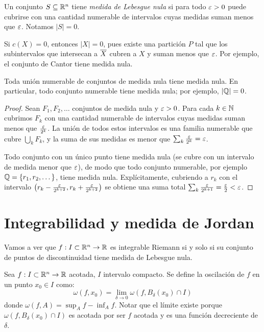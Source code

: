 \begin{definition}
  Un conjunto \(S \subseteq \mathbb{R}^n\) tiene \emph{medida de Lebesgue nula} si para todo \(\varepsilon > 0\) puede cubrirse con una cantidad numerable de intervalos cuyas medidas suman menos que \(\varepsilon\). Notamos \(|S| = 0\).
\end{definition}

\begin{eg}
  Si \(c(X) = 0\), entonces \(|X| = 0\), pues existe una partición \(P\) tal que los subintervalos que intersecan a \(\overline{X}\) cubren a \(X\) y suman menos que \(\varepsilon\). Por ejemplo, el conjunto de Cantor tiene medida nula.
\end{eg}

\begin{prop}
  Toda unión numerable de conjuntos de medida nula tiene medida nula. En particular, todo conjunto numerable tiene medida nula; por ejemplo, \(|\mathbb{Q}| = 0\).
\end{prop}

\begin{proof}
  Sean \(F_1, F_2, \dots\) conjuntos de medida nula y \(\varepsilon > 0\). Para cada \(k \in \mathbb{N}\) cubrimos \(F_k\) con una cantidad numerable de intervalos cuyas medidas suman menos que \(\frac{\varepsilon}{2^k}\). La unión de todos estos intervalos es una familia numerable que cubre \(\bigcup_k F_k\), y la suma de sus medidas es menor que \(\sum_k \frac{\varepsilon}{2^k} = \varepsilon\).

  Todo conjunto con un único punto tiene medida nula (se cubre con un intervalo de medida menor que \(\varepsilon\)), de modo que todo conjunto numerable, por ejemplo \(\mathbb{Q} = \{r_1, r_2, \dots\}\), tiene medida nula. Explícitamente, cubriendo a \(r_k\) con el intervalo \(\left( r_k - \frac{\varepsilon}{2^{k+2}}, r_k + \frac{\varepsilon}{2^{k+2}} \right)\) se obtiene una suma total \(\sum_k \frac{\varepsilon}{2^{k+1}} = \frac{\varepsilon}{2} < \varepsilon\).
\end{proof}

\section{Integrabilidad y medida de Jordan}

Vamos a ver que \(f: I \subset \mathbb{R}^n \to \mathbb{R}\) es integrable Riemann si y solo si su conjunto de puntos de discontinuidad tiene medida de Lebesgue nula.

\begin{definition}[Oscilación]
  Sea \(f: I \subset \mathbb{R}^n \to \mathbb{R}\) acotada, \(I\) intervalo compacto. Se define la oscilación de \(f\) en un punto \(x_0 \in I\) como:
  \[ \omega(f, x_0) = \lim_{\delta \to 0} \omega(f, B_\delta(x_0) \cap I) \]
  donde \(\omega(f, A) = \sup_A f - \inf_A f\). Notar que el límite existe porque \(\omega(f, B_\delta(x_0) \cap I)\) es acotada por ser \(f\) acotada y es una función decreciente de \(\delta\).
\end{definition}

